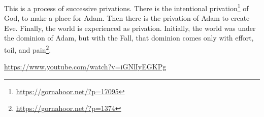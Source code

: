 This is a process of successive privations. There is the intentional privation\footnote{\url{https://gornahoor.net/?p=17095}} of God, to make a place for Adam. Then there is the privation of Adam to create Eve. Finally, the world is experienced as privation. Initially, the world was under the dominion of Adam, but with the Fall, that dominion comes only with effort, toil, and pain\footnote{\url{https://gornahoor.net/?p=1374}}.

\url{https://www.youtube.com/watch?v=iGNlIyEGKPg}


